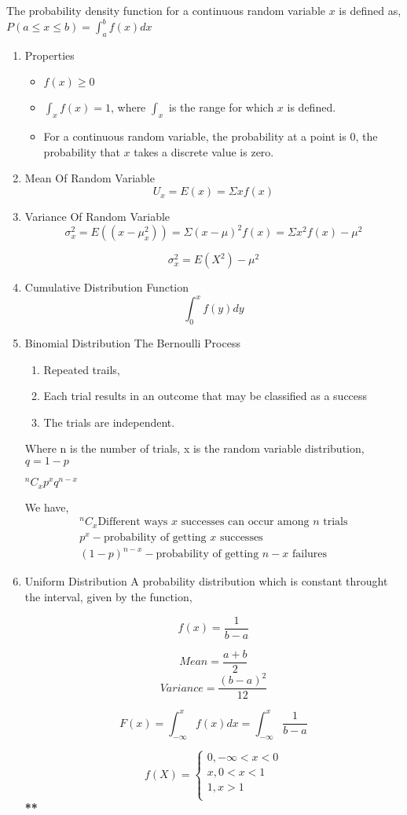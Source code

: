 \documentclass[11pt]{report}
\begin{document}
The probability density function for a continuous random variable \(x\) is defined as, \(P(a \le x \le b) = \int_a^b f(x)dx\)
\begin{enumerate}
\item Properties
\label{sec:org5f00204}
\begin{itemize}
\item \(f(x) \ge 0\)
\item \(\int_xf(x) = 1\), where \(\int_x\) is the range for which \(x\) is defined.
\item For a continuous random variable, the probability at a point is \(0\), the probability that \(x\) takes a discrete value is zero.
\end{itemize}
\item Mean Of Random Variable
\label{sec:org4bc770a}
$$U_x = E(x) = \Sigma x f(x)$$
\item Variance Of Random Variable
\label{sec:orgbc23777}
$$\sigma_x^{2} = E((x-\mu_{x}^2)) = \Sigma (x-\mu)^2 f(x) = \Sigma x^2f(x) - \mu^{2}$$

$$\sigma_x^{2} = E(X^2) - \mu^2$$
\item Cumulative Distribution Function
\label{sec:org94be28a}
$$\int_0^x f(y)dy$$
\item Binomial Distribution
\label{sec:orgf1aa26e}
The Bernoulli Process

\begin{enumerate}
\item Repeated trails,
\item Each trial results in an outcome that may be classified as a success
\item The trials are independent.
\end{enumerate}


Where n is the number of trials, x is the random variable distribution, \(q = 1 - p\)

\(^nC_xp^{x} q^{n-x}\)

We have,
\begin{align*}
^nC_x \text{Different ways $x$ successes can occur among $n$ trials} \\
p^x - \text{probability of getting $x$ successes} \\
(1-p)^{n-x} - \text{probability of getting $n-x$ failures}
\end{align*}
\item Uniform Distribution
\label{sec:org5862402}
A probability distribution which is constant throught the interval, given by the function,

$$f(x) = \frac{1}{b-a}  $$

$$Mean = \frac{a+b}{2}$$
$$Variance = \frac{(b-a)^2}{12}$$

$$F(x) = \int_{-\infty}^xf(x)dx = \int_{-\infty}^x \frac{1}{b-a}  $$

$$
f(X) =    \begin{cases}
0, - \infty < x < 0 \\
x, 0<x<1 \\
1, x > 1 \\
     \end{cases}
$$
\textbf{**}
\end{enumerate}
\end{document}
